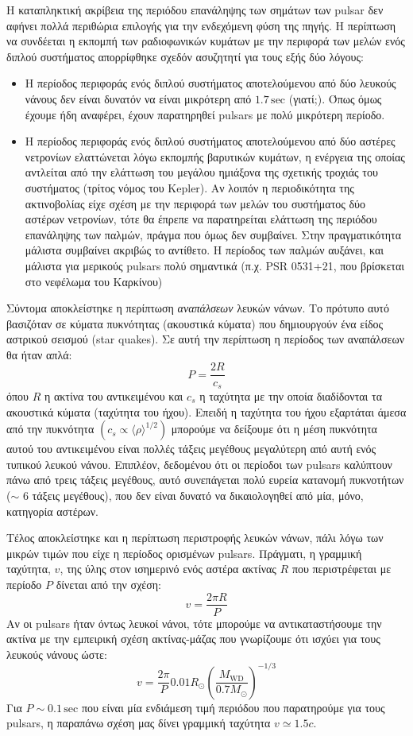 Η καταπληκτική ακρίβεια της περιόδου επανάληψης των σημάτων των pulsar δεν αφήνει πολλά περιθώρια επιλογής για την ενδεχόμενη φύση της πηγής. Η περίπτωση να συνδέεται η εκπομπή των ραδιοφωνικών κυμάτων με την περιφορά των μελών ενός διπλού συστήματος απορρίφθηκε σχεδόν ασυζητητί για τους εξής δύο λόγους:
\begin{itemize}
    \item Η περίοδος περιφοράς ενός διπλού συστήματος αποτελούμενου από δύο λευκούς νάνους δεν είναι δυνατόν να είναι μικρότερη από $1.7\,\text{sec}$ (γιατί;). Όπως όμως έχουμε ήδη αναφέρει, έχουν παρατηρηθεί pulsars με πολύ μικρότερη περίοδο.
    
    \item Η περίοδος περιφοράς ενός διπλού συστήματος αποτελούμενου από δύο αστέρες νετρονίων ελαττώνεται λόγω εκπομπής βαρυτικών κυμάτων, η ενέργεια της οποίας αντλείται από την ελάττωση του μεγάλου ημιάξονα της σχετικής τροχιάς του συστήματος (τρίτος νόμος του Kepler). Αν λοιπόν η περιοδικότητα της ακτινοβολίας είχε σχέση με την περιφορά των μελών του συστήματος δύο αστέρων νετρονίων, τότε θα έπρεπε να παρατηρείται ελάττωση της περιόδου επανάληψης των παλμών, πράγμα που όμως δεν συμβαίνει. Στην πραγματικότητα μάλιστα συμβαίνει ακριβώς το αντίθετο. Η περίοδος των παλμών αυξάνει, και μάλιστα για μερικούς pulsars πολύ σημαντικά (π.χ. PSR 0531+21, που βρίσκεται στο νεφέλωμα του Καρκίνου)
\end{itemize}
Σύντομα αποκλείστηκε η περίπτωση \textit{αναπάλσεων} λευκών νάνων. Το πρότυπο αυτό βασιζόταν σε κύματα πυκνότητας (ακουστικά κύματα) που δημιουργούν ένα είδος αστρικού σεισμού (star quakes). Σε αυτή την περίπτωση η περίοδος των αναπάλσεων θα ήταν απλά:
$$P = \frac{2R}{c_s}$$
όπου $R$ η ακτίνα του αντικειμένου και $c_s$ η ταχύτητα με την οποία διαδίδονται τα ακουστικά κύματα (ταχύτητα του ήχου). Επειδή η ταχύτητα του ήχου εξαρτάται άμεσα από την πυκνότητα $(c_s \propto {\langle \rho \rangle}^{1/2})$  μπορούμε να δείξουμε ότι η μέση πυκνότητα αυτού του αντικειμένου είναι πολλές τάξεις μεγέθους μεγαλύτερη από αυτή ενός τυπικού λευκού νάνου. Επιπλέον, δεδομένου ότι οι περίοδοι των pulsars καλύπτουν πάνω από τρεις τάξεις μεγέθους, αυτό συνεπάγεται πολύ ευρεία κατανομή πυκνοτήτων ($\sim$ 6 τάξεις μεγέθους), που δεν είναι δυνατό να δικαιολογηθεί από μία, μόνο, κατηγορία αστέρων.

Τέλος  αποκλείστηκε και η περίπτωση περιστροφής λευκών νάνων, πάλι λόγω των μικρών τιμών που είχε η περίοδος ορισμένων pulsars. Πράγματι, η γραμμική ταχύτητα, $v$, της ύλης στον ισημερινό ενός αστέρα ακτίνας $R$ που περιστρέφεται με περίοδο $P$ δίνεται από την σχέση:
$$v = \frac{2\pi R}{P}$$
Αν οι pulsars ήταν όντως λευκοί νάνοι, τότε μπορούμε να αντικαταστήσουμε την ακτίνα με την εμπειρική σχέση ακτίνας-μάζας που γνωρίζουμε ότι ισχύει για τους λευκούς νάνους ώστε:
$$v = \frac{2\pi}{P} 0.01 R_\odot \left( \frac{M_{\text{WD}}}{0.7 M_\odot} \right)^{-1/3}$$
Για $P\sim 0.1\,\text{sec}$ που είναι μία ενδιάμεση τιμή περιόδου που παρατηρούμε για τους pulsars, η παραπάνω σχέση μας δίνει γραμμική ταχύτητα $v \simeq 1.5 c$. 


